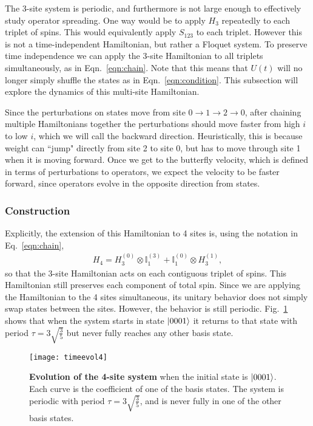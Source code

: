 The 3-site system is periodic, and furthermore is not large enough to effectively study operator spreading. One way would be to apply $H_3$ repeatedly to each triplet of spins. This would equivalently apply $S_{123}$ to each triplet. However this is not a time-independent Hamiltonian, but rather a Floquet system. To preserve time independence we can apply the 3-site Hamiltonian to all triplets simultaneously, as in Eqn.~\ref{eqn:chain}. Note that this means that $U(t)$ will no longer simply shuffle the states as in  Eqn.~\ref{eqn:condition}. This subsection will explore the dynamics of this multi-site Hamiltonian.

Since the perturbations on states move from site $0\to1\to2\to0$, after chaining multiple Hamiltonians together the perturbations should move faster from high $i$ to low $i$, which we will call the backward direction. Heuristically, this is because weight can ``jump" directly from site 2 to site 0, but has to move through site 1 when it is moving forward. Once we get to the butterfly velocity, which is defined in terms of perturbations to operators, we expect the velocity to be faster forward, since operators evolve in the opposite direction from states.

\subsubsection{Construction} \label{subsub:construction} 

Explicitly, the extension of this Hamiltonian to 4 sites is, using the notation in Eq.~\ref{eqn:chain},
\begin{align}
H_4 = H_3^{(0)}\otimes\mathbb{I}_1^{(3)} + \mathbb{I}_1^{(0)}\otimes H_3^{(1)},
\end{align}
so that the 3-site Hamiltonian acts on each contiguous triplet of spins.
This Hamiltonian still preserves each component of total spin. Since we are applying the Hamiltonian to the 4 sites simultaneous, its unitary behavior does not simply swap states between the sites. However, the behavior is still periodic. Fig.~\ref{fig:timeevol4} shows that when the system starts in state $\left|0001\right\rangle$ it returns to that state with period $\tau=3\sqrt{\frac{3}{5}}$ but never fully reaches any other basis state.
\begin{figure}
\centering
\texttt{[image: timeevol4]}
\caption{\textbf{Evolution of the 4-site system} when the initial state is $\left|0001\right\rangle$. Each curve is the coefficient of one of the basis states. The system is periodic with period $\tau=3\sqrt{\frac{3}{5}}$, and is never fully in one of the other basis states.}
\label{fig:timeevol4}
\end{figure}

